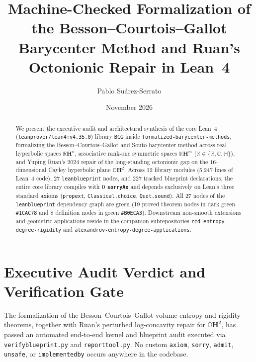 \documentclass[10pt]{article}
\title{\vspace{-1.8em}\textbf{Machine-Checked Formalization of the Besson--Courtois--Gallot\\Barycenter Method and Ruan's Octonionic Repair in Lean~4}}
\author{Pablo Su\'arez-Serrato}
\date{November 2026\vspace{-1.0em}}
\renewcommand{\_}{\origus\allowbreak}
\newcommand{\C}{\mathbb{C}}
\newcommand{\R}{\mathbb{R}}
\newcommand{\Quat}{\mathbb{H}}
\newcommand{\Oct}{\mathbb{O}}
\newcommand{\Kfield}{\mathbb{K}}
\newcommand{\Hyp}{\mathbf{H}}
\newcommand{\code}[1]{\texttt{#1}}
\newcommand{\LeanToolchain}{leanprover/lean4:v4.35.0}
\newcommand{\NModules}{12}
\newcommand{\NLines}{5{,}247}
\newcommand{\NTotalNodes}{27}
\newcommand{\NProvedNodes}{19}
\newcommand{\NDefNodes}{8}
\newcommand{\NLeanDecls}{227}
\newcommand{\NSorryAx}{0}
\begin{document}
\maketitle

\begin{abstract}
\noindent
We present the executive audit and architectural synthesis of the core Lean~4
(\code{\LeanToolchain}) library \code{BCG} inside \code{formalized-barycenter-methods}, formalizing
the Besson--Courtois--Gallot \cite{BCG95} and Souto \cite{Sou08} barycenter method across real
hyperbolic spaces $\R\Hyp^n$, associative rank-one symmetric spaces $\Kfield\Hyp^m$
($\Kfield \in \{\R, \C, \Quat\}$), and Yuping Ruan's 2024 repair \cite{Rua24} of the
long-standing octonionic gap on the $16$-dimensional Cayley hyperbolic plane $\Oct\Hyp^2$.
Across \NModules{} library modules (\NLines{} lines of Lean~4 code), \NTotalNodes{} \code{leanblueprint} nodes,
and \NLeanDecls{} tracked blueprint declarations, the entire core library compiles with \textbf{\NSorryAx{}
\code{sorryAx}} and depends exclusively on Lean's three standard axioms (\code{propext},
\code{Classical.choice}, \code{Quot.sound}). All \NTotalNodes{} nodes of the \code{leanblueprint}
dependency graph are green (\NProvedNodes{} proved theorem nodes in dark green \code{\#1CAC78} and
\NDefNodes{} definition nodes in green \code{\#B0ECA3}). Downstream non-smooth extensions and
geometric applications reside in the companion subrepositories
\code{rcd-entropy-degree-rigidity} and \code{alexandrov-entropy-degree-applications}.
\end{abstract}

\section{Executive Audit Verdict and Verification Gate}

The formalization of the Besson--Courtois--Gallot volume-entropy and rigidity theorems, together with
Ruan's perturbed log-concavity repair for $\Oct\Hyp^2$, has passed an automated end-to-end kernel and
blueprint audit executed via \code{verify\_blueprint.py} and \code{report\_tool.py}. No custom
\code{axiom}, \code{sorry}, \code{admit}, \code{unsafe}, or \code{implemented\_by} occurs anywhere in the
codebase.
\end{document}

